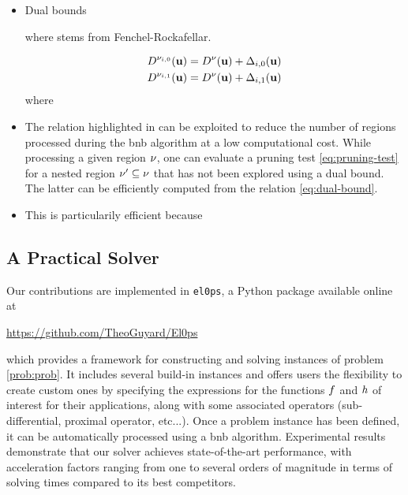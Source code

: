 \documentclass[11pt]{article}
\begin{document}
\begin{itemize}
    \item Dual bounds
    
    where stems from Fenchel-Rockafellar.
    \begin{theorem}
        \label{thm:simpruning}
        \begin{subequations}
            \begin{align}
                D^{\nu_{i,0}}(\mathbf{u}) &= D^\nu(\mathbf{u}) + \Delta_{i,0}(\mathbf{u}) \\
                D^{\nu_{i,1}}(\mathbf{u}) &= D^\nu(\mathbf{u}) + \Delta_{i,1}(\mathbf{u})
            \end{align}
        \end{subequations}
        where 
    \end{theorem}
    \item The relation highlighted in  can be exploited to reduce the number of regions processed during the \gls{bnb} algorithm at a low computational cost. While processing a given region $\nu$, one can evaluate a pruning test \eqref{eq:pruning-test} for a nested region $\nu' \subseteq \nu$ that has not been explored using a dual bound. The latter can be efficiently computed from the relation \eqref{eq:dual-bound}.
    \item This is particularily efficient because 
\end{itemize}


\subsection{A Practical Solver}

Our contributions are implemented in \texttt{el0ps}, a Python package available online at
\begin{center}
\url{https://github.com/TheoGuyard/El0ps}
\end{center}
which provides a framework for constructing and solving instances of problem \eqref{prob:prob}.
It includes several build-in instances and offers users the flexibility to create custom ones by specifying the expressions for the functions $f$ and $h$ of interest for their applications, along with some associated operators (sub-differential, proximal operator, etc...).
Once a problem instance has been defined, it can be automatically processed using a \gls{bnb} algorithm.
Experimental results demonstrate that our solver achieves state-of-the-art performance, with acceleration factors ranging from one to several orders of magnitude in terms of solving times compared to its best competitors.
\end{document}

